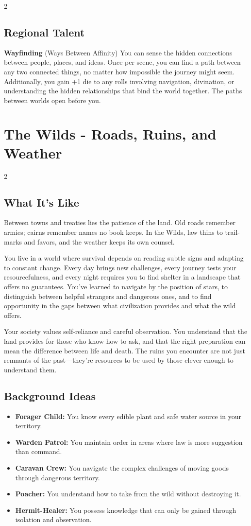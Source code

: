\documentclass[11pt]{article}
\newcommand{\region}[1]{\section*{#1}}
\newcommand{\subregion}[1]{\subsection*{#1}}
\begin{document}
\begin{multicols}{2}
\subregion{Regional Talent}

\textbf{Wayfinding} (Ways Between Affinity)
You can sense the hidden connections between people, places, and ideas. Once per scene, you can find a path between any two connected things, no matter how impossible the journey might seem. Additionally, you gain +1 die to any rolls involving navigation, divination, or understanding the hidden relationships that bind the world together. The paths between worlds open before you.

\end{multicols}

\region{The Wilds - Roads, Ruins, and Weather}

\begin{multicols}{2}
\subregion{What It's Like}

Between towns and treaties lies the patience of the land. Old roads remember armies; cairns remember names no book keeps. In the Wilds, law thins to trail-marks and favors, and the weather keeps its own counsel.

You live in a world where survival depends on reading subtle signs and adapting to constant change. Every day brings new challenges, every journey tests your resourcefulness, and every night requires you to find shelter in a landscape that offers no guarantees. You've learned to navigate by the position of stars, to distinguish between helpful strangers and dangerous ones, and to find opportunity in the gaps between what civilization provides and what the wild offers.

Your society values self-reliance and careful observation. You understand that the land provides for those who know how to ask, and that the right preparation can mean the difference between life and death. The ruins you encounter are not just remnants of the past---they're resources to be used by those clever enough to understand them.

\columnbreak

\subregion{Background Ideas}

\begin{itemize}[leftmargin=*]
    \item \textbf{Forager Child:} You know every edible plant and safe water source in your territory.
    \item \textbf{Warden Patrol:} You maintain order in areas where law is more suggestion than command.
    \item \textbf{Caravan Crew:} You navigate the complex challenges of moving goods through dangerous territory.
    \item \textbf{Poacher:} You understand how to take from the wild without destroying it.
    \item \textbf{Hermit-Healer:} You possess knowledge that can only be gained through isolation and observation.
\end{itemize}


\end{multicols}
\end{document}

